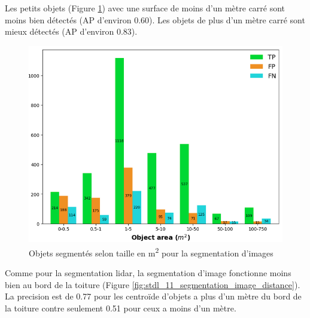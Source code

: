 \par{Les petits objets (Figure \ref{fig:stdl_10_segmentation_image_taille}) avec une surface de moins d'un mètre carré sont moins bien détectés (AP d'environ 0.60). Les objets de plus d'un mètre carré sont mieux détectés (AP d'environ 0.83).}
\begin{figure}[H]
    \centering
    \includegraphics[width=1\linewidth]{02-main//figures/ch2/stdl_10_segmentation_image_taille.png}
    \caption{Objets segmentés selon taille en \si{\unit{m^2}} pour la segmentation d’images \cite{herny_detection_2024}}
    \label{fig:stdl_10_segmentation_image_taille}
\end{figure}
\newpage
\par{Comme pour la segmentation \gls{lidar}, la segmentation d'image fonctionne moins bien au bord de la toiture (Figure \ref{fig:stdl_11_segmentation_image_distance}). La precision est de 0.77 pour les centroïde d'objets a plus d'un mètre du bord de la toiture contre seulement 0.51 pour ceux a moins d'un mètre.}

